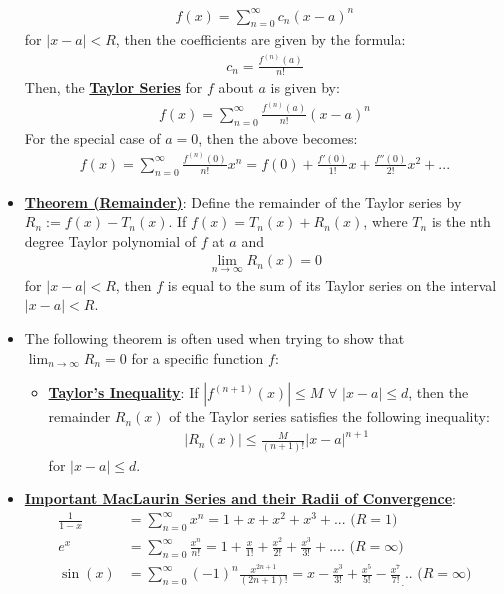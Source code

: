 \documentclass[reqno,11pt]{amsart}
\theoremstyle{definition}
\theoremstyle{remark}
\newcommand{\dfn}[1]{\underline{\textbf{#1}}}
\begin{document}
\begin{itemize}[noitemsep]
	\begin{align}
		f(x) = \sum_{n=0}^\infty c_n (x-a)^n 	
	\end{align}
	for $|x-a|<R$, then the coefficients are given by the formula: 
	\begin{align}
		c_n = \frac{f^{(n)}(a)}{n!	}	
	\end{align}
	Then, the \dfn{Taylor Series} for $f$ about $a$ is given by: 
	\begin{align}
		f(x) = \sum_{n=0}^\infty \frac{f^{(n)} (a)}{n!} (x-a)^n	
	\end{align}
	For the special case of $a=0$, then the above becomes: 
	\begin{align}
		f(x) = \sum_{n=0}^\infty \frac{f^{(n)} (0)}{n!}x^n = f(0) + \frac{f'(0)}{1!} x + \frac{f''(0)}{2!} x^2 + ... 	
	\end{align}
	\item \dfn{Theorem (Remainder)}: Define the remainder of the Taylor series by $R_n := f(x) - T_n(x)$. If $f(x) = T_n(x) + R_n(x)$, where $T_n$ is the nth degree Taylor polynomial of $f$ at $a$ and
	\begin{align}
		\lim_{n \rightarrow \infty} R_n(x) = 0 	
	\end{align}
	for $|x-a| < R$, then $f$ is equal to the sum of its Taylor series on the interval $|x-a|<R $.
	\item The following theorem is often used when trying to show that $\lim_{n \rightarrow \infty} R_n =0$ for a specific function $f$: 
	\begin{itemize}[noitemsep]
		\item \dfn{Taylor's Inequality}: If $|f^{(n+1)}(x)| \leq M$ $\forall $ $|x-a| \leq d$, then the remainder $R_n(x)$ of the Taylor series satisfies the following inequality: 
		\begin{align}
			|R_n(x) | \leq \frac{M}{(n+1)!}	|x-a|^{n+1} 
		\end{align}
		for $|x-a| \leq d$. 
	\end{itemize}
	\item \dfn{Important MacLaurin Series and their Radii of Convergence}: 
	\begin{align}
		\frac{1}{1-x} & = \sum_{n=0}^\infty x^n = 1 + x + x^2 + x^3 + ... \text{ ($R=1$) } \\
		e^x & = \sum_{n=0}^\infty \frac{x^n}{n!} = 1 + \frac{x}{1!} + \frac{x^2}{2!} + \frac{x^3}{3!} + .... \text{ ($R= \infty$)} \\
		\sin (x) &  = \sum_{n=0}^\infty (-1)^n \frac{x^{2n+1}}{(2n+1)!} = x - \frac{x^3}{3!} + \frac{x^5}{5!} - \frac{x^7}{7!} _ ... \text{ ($R =\infty$)} \\

\end{align}
\end{itemize}
\end{document}
